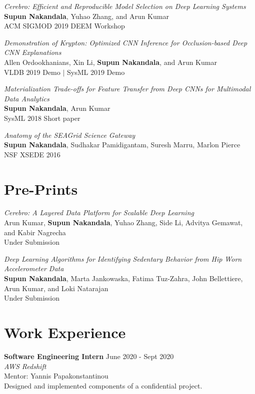 \documentclass[margin]{res}
\begin{document}
\begin{resume}
\par
\textit{Cerebro: Efficient and Reproducible Model Selection on Deep Learning Systems} \\
\textbf{Supun Nakandala}, Yuhao Zhang, and Arun Kumar\\
ACM SIGMOD 2019 DEEM Workshop

\par
\textit{Demonstration of Krypton: Optimized CNN Inference for Occlusion-based Deep CNN Explanations} \\
Allen Ordookhanians, Xin Li, \textbf{Supun Nakandala}, and Arun Kumar\\
VLDB 2019 Demo $|$ SysML 2019 Demo

\par
\textit{Materialization Trade-offs for Feature Transfer from Deep CNNs for Multimodal Data Analytics} \\
\textbf{Supun Nakandala}, Arun Kumar\\
SysML 2018 Short paper

\par
\textit{Anatomy of the SEAGrid Science Gateway} \\
\textbf{Supun Nakandala}, Sudhakar Pamidigantam, Suresh Marru, Marlon Pierce\\
NSF XSEDE 2016


\vspace{2mm}
\section{Pre-Prints}
\par
\textit{Cerebro: A Layered Data Platform for Scalable Deep Learning} \\
Arun Kumar, \textbf{Supun Nakandala}, Yuhao Zhang, Side Li, Advitya Gemawat, and Kabir Nagrecha\\
Under Submission

\par
\textit{Deep Learning Algorithms for Identifying Sedentary Behavior from Hip Worn Accelerometer Data} \\
\textbf{Supun Nakandala}, Marta Jankowaska, Fatima Tuz-Zahra, John Bellettiere, Arun Kumar, and Loki Natarajan\\
Under Submission


\section{Work Experience}

\textbf{Software Engineering Intern}
\hfill June 2020 - Sept 2020 \\
\textit{AWS Redshift} \\
Mentor: Yannis Papakonstantinou\\
Designed and implemented components of a confidential project.


\end{resume}
\end{document}
